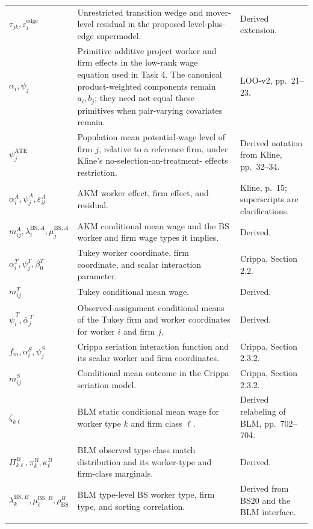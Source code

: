 \documentclass[11pt]{article}
\begin{document}
\begin{longtable}{p{}p{}p{}}
\(\tau_{jk},\varepsilon_i^{\mathrm{edge}}\) & Unrestricted transition wedge
and mover-level residual in the proposed level-plus-edge supermodel. &
Derived extension. \\
\(\alpha_i,\psi_j\) & Primitive additive project worker and firm effects in
the low-rank wage equation used in Task 4.  The canonical product-weighted
components remain \(a_i,b_j\); they need not equal these primitives when
pair-varying covariates remain. & LOO-v2, pp.\ 21--23. \\
\(\psi_j^{\mathrm{ATE}}\) & Population mean potential-wage level of firm
\(j\), relative to a reference firm, under Kline's no-selection-on-treatment-
effects restriction. & Derived notation from Kline, pp.\ 32--34. \\
\(\alpha_i^A,\psi_j^A,\varepsilon_{it}^A\) & AKM worker effect, firm effect,
and residual. & Kline, p.\ 15; superscripts are clarifications. \\
\(m^A_{ij},\lambda_i^{\mathrm{BS},A},
\mu_j^{\mathrm{BS},A}\) & AKM conditional mean wage and the BS worker and
firm wage types it implies. & Derived. \\
\(\alpha_i^T,\psi_j^T,\beta_0^T\) & Tukey worker coordinate, firm coordinate,
and scalar interaction parameter. & Crippa, Section 2.2. \\
\(m^T_{ij}\) & Tukey conditional mean wage. & Derived. \\
\(\bar\psi_i^{\,T},\bar\alpha_j^{\,T}\) & Observed-assignment conditional
means of the Tukey firm and worker coordinates for worker \(i\) and firm
\(j\). & Derived. \\
\(f_m,\alpha_i^S,\psi_j^S\) & Crippa seriation interaction function and its
scalar worker and firm coordinates. & Crippa, Section 2.3.2. \\
\(m^S_{ij}\) & Conditional mean outcome in the Crippa seriation model. &
Crippa, Section 2.3.2. \\
\(\zeta_{k\ell}\) & BLM static conditional mean wage for worker type \(k\)
and firm class \(\ell\). & Derived relabeling of BLM, pp.\ 702--704. \\
\(\Pi^B_{k\ell},\pi_k^B,\kappa_\ell^B\) & BLM observed type-class match
distribution and its worker-type and firm-class marginals. & Derived. \\
\(\lambda_k^{\mathrm{BS},B},\mu_\ell^{\mathrm{BS},B},
\rho_{\mathrm{BS}}^B\) & BLM type-level BS worker type, firm type, and
sorting correlation. & Derived from BS20 and the BLM interface. \\
\(\bar\zeta^B,c_{\mathrm{BS}}^B,

\end{longtable}
\end{document}
